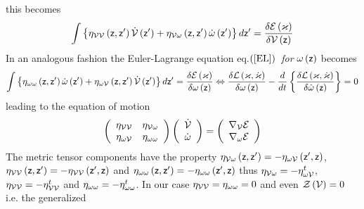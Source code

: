 this becomes 
\begin{equation}
\int \left\{ \eta _{{\cal VV}}\left( {\sf z,z}^{\prime }\right) {\cal \dot{V}%
}\left( {\sf z}^{\prime }\right) +\eta _{{\cal V\omega }}\left( {\sf z,z}%
^{\prime }\right) {\cal \dot{\omega}}\left( {\sf z}^{\prime }\right)
\right\} d{\sf z}^{\prime }=\frac{\delta {\cal E}\left( {\cal \varkappa }%
\right) }{\delta {\cal V}\left( {\sf z}\right) }
\end{equation}%
In an analogous fashion the Euler-Lagrange equation eq.$\left( \ref{EL}%
\right) ${\em \ for} ${\cal \omega }\left( {\sf z}\right) $ becomes 
\begin{equation}
\int \left\{ \eta _{{\cal \omega \omega }}\left( {\sf z,z}^{\prime }\right) 
{\cal \dot{\omega}}\left( {\sf z}^{\prime }\right) +\eta _{\omega {\cal V}%
}\left( {\sf z,z}^{\prime }\right) {\cal \dot{V}}\left( {\sf z}^{\prime
}\right) \right\} d{\sf z}^{\prime }=\frac{\delta {\cal E}\left( {\cal %
\varkappa }\right) }{\delta {\cal \omega }\left( {\sf z}\right) }%
\Leftrightarrow \frac{\delta {\cal L}\left( {\cal \varkappa },{\cal \dot{%
\varkappa}}\right) }{\delta \omega \left( {\sf z}\right) }-\frac{d}{dt}%
\left\{ \frac{\delta {\cal L}\left( {\cal \varkappa },{\cal \dot{\varkappa}}%
\right) }{\delta \dot{\omega}\left( {\sf z}\right) }\right\} =0
\end{equation}%
leading to the equation of motion 
\begin{equation}
\left( 
\begin{array}{cc}
\eta _{{\cal VV}} & \eta _{{\cal V\omega }} \\ 
\eta _{\omega {\cal V}} & \eta _{\omega \omega }%
\end{array}%
\right) \left( 
\begin{array}{c}
{\cal \dot{V}} \\ 
{\cal \dot{\omega}}%
\end{array}%
\right) =\left( 
\begin{array}{c}
\nabla _{{\cal V}}{\cal E} \\ 
\nabla _{\omega }{\cal E}%
\end{array}%
\right)
\end{equation}%
The metric tensor components have the property $\eta _{{\cal V\omega }%
}\left( {\sf z,z}^{\prime }\right) =-\eta _{{\cal \omega V}}\left( {\sf z}%
^{\prime },{\sf z}\right) $, $\eta _{{\cal VV}}\left( {\sf z,z}^{\prime
}\right) =-\eta _{{\cal VV}}\left( {\sf z}^{\prime },{\sf z}\right) $ and $%
\eta _{{\cal \omega \omega }}\left( {\sf z,z}^{\prime }\right) =-\eta _{%
{\cal \omega \omega }}\left( {\sf z}^{\prime },{\sf z}\right) $ thus $\eta _{%
{\cal V\omega }}=-\eta _{{\cal \omega V}}^{t}$, $\eta _{{\cal VV}}=-\eta _{%
{\cal VV}}^{t}$ and $\eta _{{\cal \omega \omega }}=-\eta _{{\cal \omega
\omega }}^{t}$. In our case $\eta _{{\cal VV}}=\eta _{{\cal \omega \omega }%
}=0$ and even ${\cal Z}\left( {\cal V}\right) =0$ i.e. the generalized
